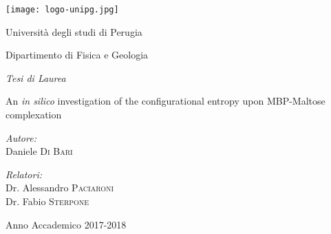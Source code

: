 \begin{titlepage}
\pagestyle{empty}
\begin{center}
\texttt{[image: logo-unipg.jpg]}
 
\vfill
{\LARGE Universit\`{a} degli studi di Perugia}

\vspace{3mm} {\Large Dipartimento di Fisica e Geologia}
\vfill
 	 
\begin{large}
\emph{Tesi di Laurea}
\end{large}
	
\vfill

\begin{LARGE}
An \textit{in silico} investigation of the configurational entropy upon MBP-Maltose complexation
\end{LARGE}
\vfill
\vfill

\begin{minipage}{0.4\textwidth}
\begin{flushleft} \large
\emph{Autore:}\\
Daniele \textsc{Di Bari}
\end{flushleft}
\end{minipage}
\hfill
\begin{minipage}{0.5\textwidth}
\begin{flushright} \large
\emph{Relatori:} \\
Dr. Alessandro \textsc{Paciaroni}\\
Dr. Fabio \textsc{Sterpone}
\end{flushright}
\end{minipage}

\vfill
	
{Anno Accademico 2017-2018}
\end{center}
\cleardoublepage
	
\end{titlepage}

